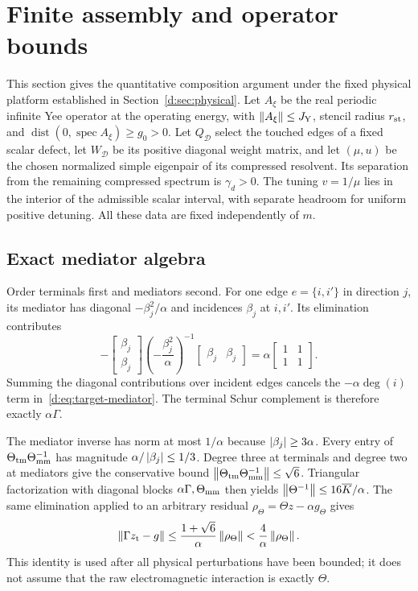 \section{Finite assembly and operator bounds}\label{d:app:composition}

This section gives the quantitative composition argument under the fixed physical platform established in Section~\ref{d:sec:physical}. Let $A_\xi$ be the real periodic infinite Yee operator at the operating energy, with $\left\lVert A_\xi\right\rVert\le J_{\rm Y}$, stencil radius $r_{\rm st}$, and $\operatorname{dist}(0,\operatorname{spec}A_\xi)\ge g_0>0$. Let $Q_{\mathcal D}$ select the touched edges of a fixed scalar defect, let $W_{\mathcal D}$ be its positive diagonal weight matrix, and let $(\mu,u)$ be the chosen normalized simple eigenpair of its compressed resolvent. Its separation from the remaining compressed spectrum is $\gamma_d>0$. The tuning $v=1/\mu$ lies in the interior of the admissible scalar interval, with separate headroom for uniform positive detuning. All these data are fixed independently of $m$.

\subsection{Exact mediator algebra}

Order terminals first and mediators second. For one edge $e=\{i,i'\}$ in direction $j$, its mediator has diagonal $-\beta_j^2/\alpha$ and incidences $\beta_j$ at $i,i'$. Its elimination contributes
\[
 -\begin{bmatrix}\beta_j\\\beta_j\end{bmatrix}
   \left(-\frac{\beta_j^2}{\alpha}\right)^{-1}
   \begin{bmatrix}\beta_j&\beta_j\end{bmatrix}
 =\alpha\begin{bmatrix}1&1\\1&1\end{bmatrix}.
\]
Summing the diagonal contributions over incident edges cancels the $-\alpha\deg(i)$ term in~\eqref{d:eq:target-mediator}. The terminal Schur complement is therefore exactly $\alpha\Gamma$.

The mediator inverse has norm at most $1/\alpha$ because $\left\lvert \beta_j\right\rvert\ge3\alpha$. Every entry of $\Theta_{\rm tm}\Theta_{\rm mm}^{-1}$ has magnitude $\alpha/\left\lvert \beta_j\right\rvert\le1/3$. Degree three at terminals and degree two at mediators give the conservative bound $\left\lVert \Theta_{\rm tm}\Theta_{\rm mm}^{-1}\right\rVert\le\sqrt6$. Triangular factorization with diagonal blocks $\alpha\Gamma,\Theta_{\rm mm}$ then yields $\left\lVert \Theta^{-1}\right\rVert\le16\overline K/\alpha$. The same elimination applied to an arbitrary residual $\rho_\Theta=\Theta z-\alpha g_\Theta$ gives
\begin{equation}\label{d:eq:app-mediator-residual}
 \left\lVert \Gamma z_{\rm t}-g\right\rVert
 \le\frac{1+\sqrt6}{\alpha}\left\lVert \rho_\Theta\right\rVert
 <\frac4\alpha\left\lVert \rho_\Theta\right\rVert.
\end{equation}
This identity is used after all physical perturbations have been bounded; it does not assume that the raw electromagnetic interaction is exactly $\Theta$.


